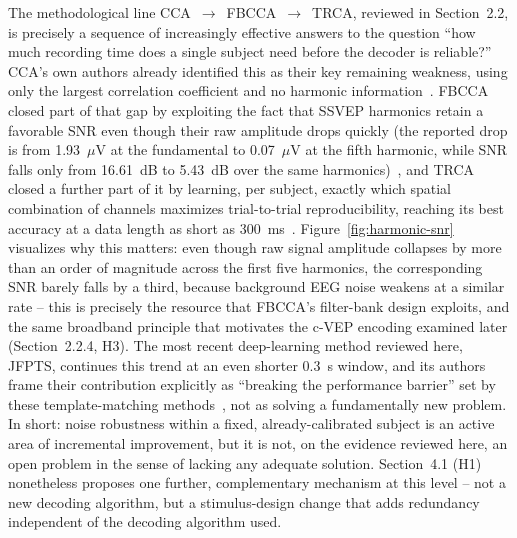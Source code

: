 \documentclass[11pt]{article}
\begin{document}
The methodological line CCA~$\rightarrow$~FBCCA~$\rightarrow$~TRCA, reviewed in Section~2.2, is precisely a sequence of increasingly effective answers to the question ``how much recording time does a single subject need before the decoder is reliable?'' CCA's own authors already identified this as their key remaining weakness, using only the largest correlation coefficient and no harmonic information~\cite{lin2007cca}. FBCCA closed part of that gap by exploiting the fact that SSVEP harmonics retain a favorable SNR even though their raw amplitude drops quickly (the reported drop is from 1.93~$\mu$V at the fundamental to 0.07~$\mu$V at the fifth harmonic, while SNR falls only from 16.61~dB to 5.43~dB over the same harmonics)~\cite{chen2015fbcca}, and TRCA closed a further part of it by learning, per subject, exactly which spatial combination of channels maximizes trial-to-trial reproducibility, reaching its best accuracy at a data length as short as 300~ms~\cite{nakanishi2018trca}. Figure~\ref{fig:harmonic-snr} visualizes why this matters: even though raw signal amplitude collapses by more than an order of magnitude across the first five harmonics, the corresponding SNR barely falls by a third, because background EEG noise weakens at a similar rate -- this is precisely the resource that FBCCA's filter-bank design exploits, and the same broadband principle that motivates the c-VEP encoding examined later (Section~2.2.4, H3). The most recent deep-learning method reviewed here, JFPTS, continues this trend at an even shorter 0.3~s window, and its authors frame their contribution explicitly as ``breaking the performance barrier'' set by these template-matching methods~\cite{ding2026jfpts}, not as solving a fundamentally new problem. In short: noise robustness within a fixed, already-calibrated subject is an active area of incremental improvement, but it is not, on the evidence reviewed here, an open problem in the sense of lacking any adequate solution. Section~4.1 (H1) nonetheless proposes one further, complementary mechanism at this level -- not a new decoding algorithm, but a stimulus-design change that adds redundancy independent of the decoding algorithm used.
\end{document}
